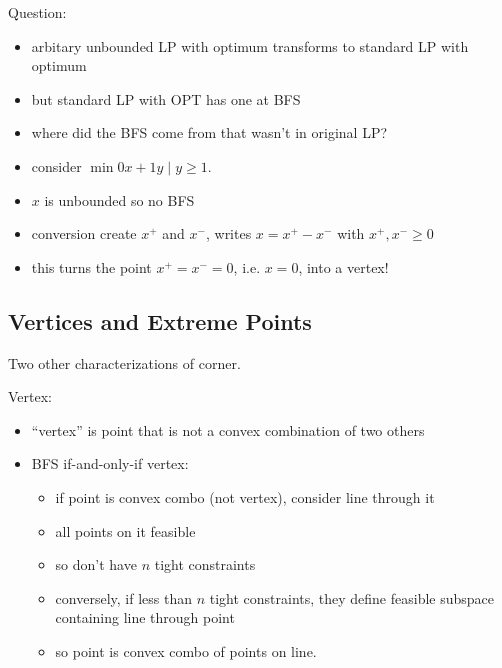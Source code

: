 \documentclass{article}
\begin{document}
Question: 
\begin{itemize}
\item arbitary unbounded LP with optimum transforms to standard LP
  with optimum
\item but standard LP with OPT has one at BFS
\item where did the BFS come from that wasn't in original LP?
\item consider  $\min 0x+1y \mid y \ge 1$.
\item $x$ is unbounded so no BFS
\item conversion create $x^+$ and $x^-$, writes $x=x^+-x^-$ with
  $x^+,x^- \ge 0$
\item this turns the point $x^+=x^-=0$, i.e. $x=0$, into a vertex!
\end{itemize}

\subsection{Vertices and Extreme Points}
Two other characterizations of corner.

Vertex:
\begin{itemize}
\item ``vertex'' is point that is not a convex combination of two
others
\item BFS if-and-only-if vertex: 
\begin{itemize}
\item if point is convex combo (not vertex), consider line through it
\item all points on it feasible
\item so don't have $n$ tight constraints
\item conversely, if less than $n$ tight constraints, they define
  feasible subspace containing line through point 
\item so point is convex combo of points on line.
\end{itemize}
\end{itemize}
\end{document}
